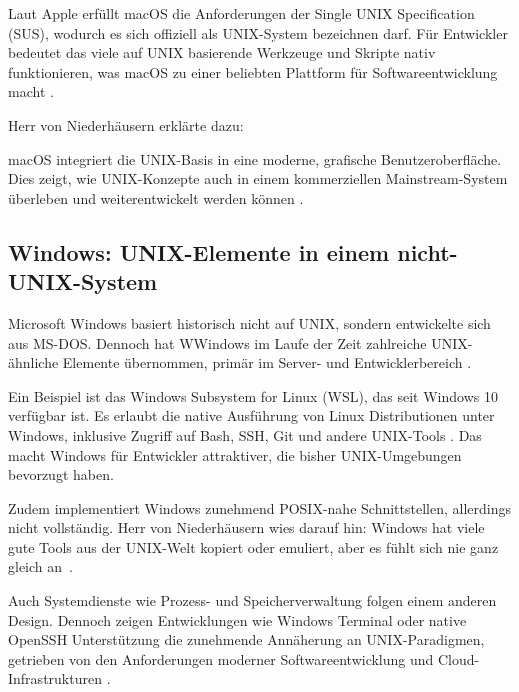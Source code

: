 Laut Apple erfüllt macOS die Anforderungen der Single UNIX Specification (SUS), wodurch es sich offiziell als UNIX-System bezeichnen darf. Für Entwickler bedeutet
das viele auf UNIX basierende Werkzeuge und Skripte nativ funktionieren, was macOS zu einer beliebten Plattform für Softwareentwicklung macht \cite{OSConcept}.

Herr von Niederhäusern erklärte dazu: %

macOS integriert die UNIX-Basis in eine moderne, grafische Benutzeroberfläche. Dies zeigt, wie UNIX-Konzepte auch in einem kommerziellen Mainstream-System überleben
und weiterentwickelt werden können \cite{FreeBSDOS}.


\newpage
\subsection{Windows: UNIX-Elemente in einem nicht-UNIX-System}

Microsoft Windows basiert historisch nicht auf UNIX, sondern entwickelte sich aus MS-DOS. Dennoch hat WWindows im Laufe der Zeit zahlreiche UNIX-ähnliche Elemente
übernommen, primär im Server- und Entwicklerbereich \cite{ModernOS}.

Ein Beispiel ist das Windows Subsystem for Linux (WSL), das seit Windows 10 verfügbar ist. Es erlaubt die native Ausführung von Linux Distributionen unter Windows,
inklusive Zugriff auf Bash, SSH, Git und andere UNIX-Tools \cite{WSL}. Das macht Windows für Entwickler attraktiver, die bisher UNIX-Umgebungen bevorzugt haben.

Zudem implementiert Windows zunehmend POSIX-nahe Schnittstellen, allerdings nicht vollständig. Herr von Niederhäusern wies darauf hin: \glqq Windows hat viele gute
Tools aus der UNIX-Welt kopiert oder emuliert, aber es fühlt sich nie ganz gleich an\grqq \ \cite{interviewNH}.

Auch Systemdienste wie Prozess- und Speicherverwaltung folgen einem anderen Design. Dennoch zeigen Entwicklungen wie Windows Terminal oder native OpenSSH
Unterstützung die zunehmende Annäherung an UNIX-Paradigmen, getrieben von den Anforderungen moderner Softwareentwicklung und Cloud-Infrastrukturen
\cite{ArtOfUnixProgramming, OSConcept}.